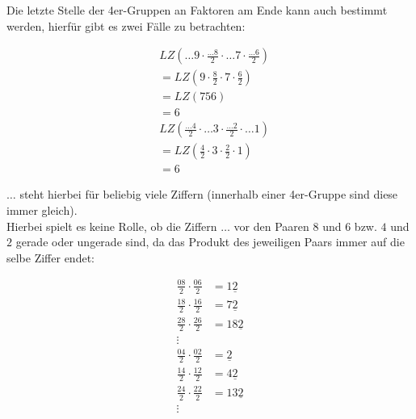Die letzte Stelle der 4er-Gruppen an Faktoren am Ende kann auch bestimmt werden, hierfür gibt es zwei Fälle zu betrachten:
\begin{multicols}{2}
	\noindent
	\begin{equation*}
		\begin{split}
			&LZ\left(\dots9 \cdot \frac{\dots8}{2} \cdot \dots7 \cdot \frac{\dots6}{2}\right) \\
			&= LZ\left(9\cdot\frac{8}{2}\cdot7\cdot\frac{6}{2}\right) \\
			&= LZ\left(756\right) \\
			&= 6
		\end{split}
	\end{equation*}
	\begin{equation*}
		\begin{split}
			&LZ\left(\frac{\dots4}{2} \cdot \dots3 \cdot \frac{\dots2}{2} \cdot \dots1\right) \\
			&= LZ\left(\frac{4}{2} \cdot 3 \cdot \frac{2}{2} \cdot 1\right) \\
			&= 6
		\end{split}
	\end{equation*}
\end{multicols}

$\dots$ steht hierbei für beliebig viele Ziffern (innerhalb einer 4er-Gruppe sind diese immer gleich).
\\[10pt]
Hierbei spielt es keine Rolle, ob die Ziffern $\dots$ vor den Paaren $8$ und $6$ bzw. $4$ und $2$ gerade oder ungerade sind, da das Produkt des jeweiligen Paars immer auf die selbe Ziffer endet:
\begin{multicols}{2}
	\noindent
	\begin{equation*}
		\begin{split}
			\frac{08}{2} \cdot \frac{06}{2} &= 1\underline{2} \\
			\frac{18}{2} \cdot \frac{16}{2} &= 7\underline{2} \\
			\frac{28}{2} \cdot \frac{26}{2} &= 18\underline{2} \\
			\vdots
		\end{split}
	\end{equation*}
	\begin{equation*}
		\begin{split}
			\frac{04}{2} \cdot \frac{02}{2} &= \underline{2} \\
			\frac{14}{2} \cdot \frac{12}{2} &= 4\underline{2} \\
			\frac{24}{2} \cdot \frac{22}{2} &= 13\underline{2} \\
			\vdots
		\end{split}
	\end{equation*}
\end{multicols}

